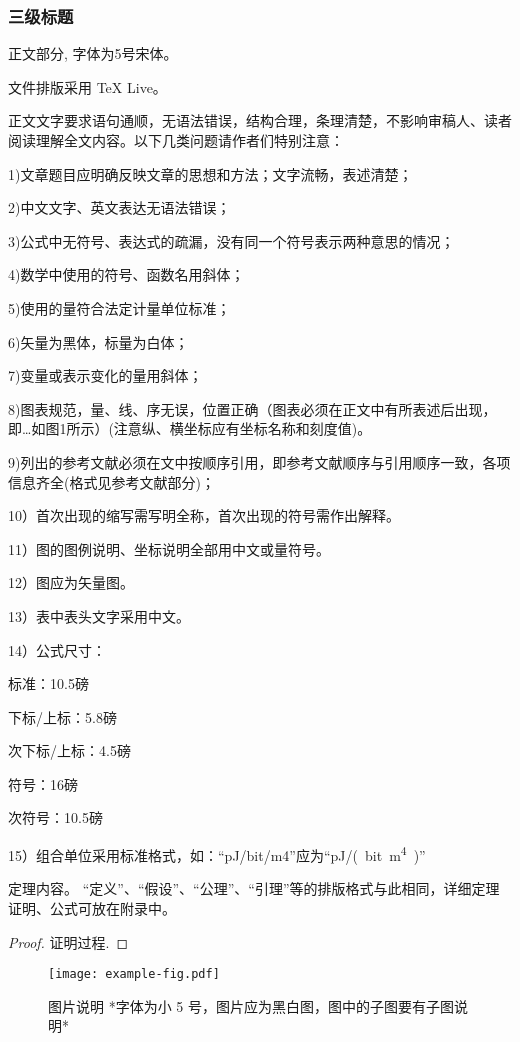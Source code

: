 \documentclass{cjc}
\begin{document}
\subsubsection{三级标题}

正文部分, 字体为5号宋体。

文件排版采用 TeX Live。

正文文字要求语句通顺，无语法错误，结构合理，条理清楚，不影响审稿人、读者阅读理解全文内容。以下几类问题请作者们特别注意：

1)文章题目应明确反映文章的思想和方法；文字流畅，表述清楚；

2)中文文字、英文表达无语法错误；

3)公式中无符号、表达式的疏漏，没有同一个符号表示两种意思的情况；

4)数学中使用的符号、函数名用斜体；

5)使用的量符合法定计量单位标准；

6)矢量为黑体，标量为白体；

7)变量或表示变化的量用斜体；

8)图表规范，量、线、序无误，位置正确（图表必须在正文中有所表述后出现，即…如图1所示）(注意纵、横坐标应有坐标名称和刻度值)。

9)列出的参考文献必须在文中按顺序引用，即参考文献顺序与引用顺序一致，各项信息齐全(格式见参考文献部分)；

10）首次出现的缩写需写明全称，首次出现的符号需作出解释。

11）图的图例说明、坐标说明全部用中文或量符号。

12）图应为矢量图。

13）表中表头文字采用中文。

14）公式尺寸：

标准：10.5磅

下标/上标：5.8磅

次下标/上标：4.5磅

符号：16磅

次符号：10.5磅

15）组合单位采用标准格式，如：“pJ/bit/m4”应为“\si{pJ/(bit.m^4)}”


\begin{theorem}
  定理内容。
  “定义”、“假设”、“公理”、“引理”等的排版格式与此相同，详细定理证明、公式可放在附录中。
\end{theorem}

\begin{proof}
  证明过程.
\end{proof}

\begin{figure}[htb]
  \centering
  \texttt{[image: example-fig.pdf]}
  \caption{图片说明 *字体为小 5 号，图片应为黑白图，图中的子图要有子图说明*}
\end{figure}
\end{document}
